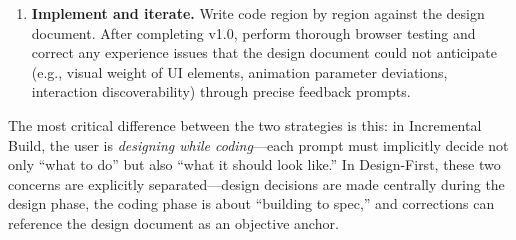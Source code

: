 \begin{enumerate}
    \item \textbf{Implement and iterate.} Write code region by region against the design document. After completing v1.0, perform thorough browser testing and correct any experience issues that the design document could not anticipate (e.g., visual weight of UI elements, animation parameter deviations, interaction discoverability) through precise feedback prompts.
\end{enumerate}

The most critical difference between the two strategies is this: in Incremental Build, the user is \textit{designing while coding}---each prompt must implicitly decide not only ``what to do'' but also ``what it should look like.'' In Design-First, these two concerns are explicitly separated---design decisions are made centrally during the design phase, the coding phase is about ``building to spec,'' and corrections can reference the design document as an objective anchor.
